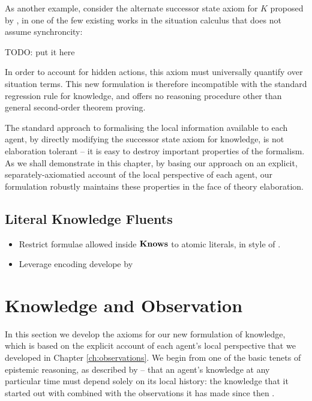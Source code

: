As another example, consider the alternate successor state axiom for
$K$ proposed by \citet{Lesperance99sitcalc_approach}, in one of
the few existing works in the situation calculus that does not assume
synchroncity:

TODO: put it here

In order to account for hidden actions, this axiom must universally
quantify over situation terms. This new formulation is therefore incompatible
with the standard regression rule for knowledge, and \citep{Lesperance99sitcalc_approach}
offers no reasoning procedure other than general second-order theorem
proving.

The standard approach to formalising the local information available
to each agent, by directly modifying the successor state axiom for
knowledge, is not elaboration tolerant -- it is easy to destroy important
properties of the formalism. As we shall demonstrate in this chapter,
by basing our approach on an explicit, separately-axiomatied account
of the local perspective of each agent, our formulation robustly maintains
these properties in the face of theory elaboration.


\subsection{Literal Knowledge Fluents}

\begin{itemize}
\item Restrict formulae allowed inside $\mathbf{Knows}$ to atomic literals, in
style of \citet{demolombe00tractable_sc_belief}. 
\item Leverage encoding develope by \citet{petrick02knowledge_equivalence} 
\end{itemize}

\section{Knowledge and Observation\label{sec:Knowledge:Observation}}

In this section we develop the axioms for our new formulation of knowledge,
which is based on the explicit account of each agent's local perspective
that we developed in Chapter \ref{ch:observations}. We begin from
one of the basic tenets of epistemic reasoning, as described by \citep{halpern90knowledge_distrib}
-- that an agent's knowledge at any particular time must depend solely
on its local history: the knowledge that it started out with combined
with the observations it has made since then .

